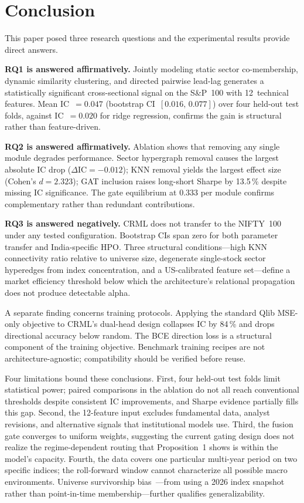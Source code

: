 \documentclass[journal]{IEEEtran}
\begin{document}
\section{Conclusion}

This paper posed three research questions and the experimental results
provide direct answers.

\textbf{RQ1 is answered affirmatively.} Jointly modeling static sector
co-membership, dynamic similarity clustering, and directed pairwise
lead-lag generates a statistically significant cross-sectional signal on
the S\&P~100 with 12~technical features. Mean IC~$=0.047$ (bootstrap
CI~$[0.016,\,0.077]$) over four held-out test folds, against IC~$=0.020$
for ridge regression, confirms the gain is structural rather than
feature-driven.

\textbf{RQ2 is answered affirmatively.} Ablation shows that removing
any single module degrades performance. Sector hypergraph removal causes
the largest absolute IC drop ($\Delta\mathrm{IC}=-0.012$); KNN removal
yields the largest effect size (Cohen's $d=2.323$); GAT inclusion
raises long-short Sharpe by 13.5\,\% despite missing IC significance.
The gate equilibrium at 0.333 per module confirms complementary rather
than redundant contributions.

\textbf{RQ3 is answered negatively.} CRML does not transfer to the
NIFTY~100 under any tested configuration. Bootstrap CIs span zero for
both parameter transfer and India-specific HPO. Three structural
conditions---high KNN connectivity ratio relative to universe size,
degenerate single-stock sector hyperedges from index concentration, and
a US-calibrated feature set---define a market efficiency threshold below
which the architecture's relational propagation does not produce
detectable alpha.

A separate finding concerns training protocols. Applying the standard
Qlib MSE-only objective to CRML's dual-head design collapses IC by
84\,\% and drops directional accuracy below random. The BCE direction
loss is a structural component of the training objective. Benchmark
training recipes are not architecture-agnostic; compatibility should be
verified before reuse.

Four limitations bound these conclusions. First, four held-out test
folds limit statistical power; paired comparisons in the ablation do not
all reach conventional thresholds despite consistent IC improvements,
and Sharpe evidence partially fills this gap. Second, the 12-feature
input excludes fundamental data, analyst revisions, and alternative
signals that institutional models use. Third, the fusion gate converges
to uniform weights, suggesting the current gating design does not
realize the regime-dependent routing that Proposition~1 shows is within
the model's capacity. Fourth, the data covers one particular multi-year
period on two specific indices; the roll-forward window cannot
characterize all possible macro environments. Universe survivorship
bias~\cite{brown1992survivorship}---from using a 2026 index snapshot
rather than point-in-time membership---further qualifies generalizability.
\end{document}
